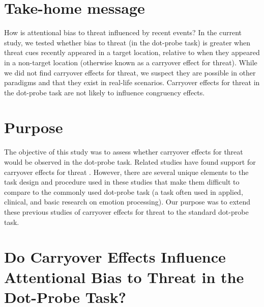 \documentclass{article}
\begin{document}
	\section{Take-home message}



	How is attentional bias to threat influenced by recent events? In the current study, we tested whether bias to threat (in the dot-probe task) is greater when threat cues recently appeared in a target location, relative to when they appeared in a non-target location (otherwise known as a carryover effect for threat). While we did not find carryover effects for threat, we suspect they are possible in other paradigms and that they exist in real-life scenarios. Carryover effects for threat in the dot-probe task are not likely to influence congruency effects.







	\section{Purpose }



	The objective of this study was to assess whether carryover effects for threat would be observed in the dot-probe task. Related studies have found support for carryover effects for threat \parencite{Gladwin2017, Gladwin2017, Gladwin2019, Gladwin2020, Gladwin2019a}. However, there are several unique elements to the task design and procedure used in these studies that make them difficult to compare to the commonly used dot-probe task (a task often used in applied, clinical, and basic research on emotion processing). Our purpose was to extend these previous studies of carryover effects for threat to the standard dot-probe task.























	\section{Do Carryover Effects Influence Attentional Bias to Threat in the Dot-Probe Task?}
\end{document}
